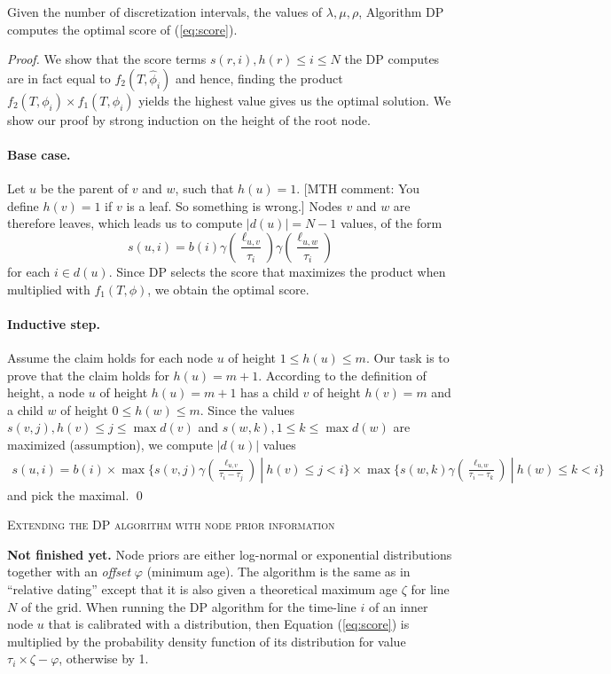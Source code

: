 \documentclass{llncs}
\newcommand{\mthcomment}[1]{{[\color{red}MTH comment: #1]}}
\renewcommand{\section}[1]{%
\bigskip
\begin{center}
\begin{Large}
\normalfont\scshape #1
\medskip
\end{Large}
\end{center}}
\begin{document}
\begin{theorem}[Optimality of DP]
Given the number of discretization intervals, the values of $\lambda,\mu,\rho$,
Algorithm DP computes the optimal score of (\ref{eq:score}).
\end{theorem}
\begin{proof}
We show that the score terms $s(r,i), h(r) \leq i \leq N$ the DP computes are
in fact equal to $f_2(T,\hat\phi_i)$ and hence, finding the product
$f_2(T,\phi_i)\times f_1(T,\phi_i)$ yields the highest value gives us the
optimal solution. We show our proof by strong induction on the height of the
root node.
\paragraph{Base case.} Let $u$ be the parent of $v$ and $w$, such that $h(u) =
1$. \mthcomment{You define $h(v) = 1$ if $v$ is a leaf. So something is wrong.}
 Nodes $v$ and $w$ are therefore leaves, which leads us to compute
$|d(u)|=N-1$ values, of the form
%
%
$$
s(u,i) = b(i)
         \gamma(\frac{\ell_{u,v}}{\tau_i})
         \gamma(\frac{\ell_{u,w}}{\tau_i})
$$
%
%
for each $i \in d(u)$. Since DP selects the score that maximizes the product
when multiplied with $f_1(T,\phi)$, we obtain the optimal score.
\paragraph{Inductive step.} Assume the claim holds for each node $u$ of height
$1 \leq h(u) \leq m$. Our task is to prove that the claim holds for $h(u) =
m+1$.  According to the definition of height, a node $u$ of height $h(u)=m+1$
has a child $v$ of height $h(v)=m$ and a child $w$ of height $0 \leq h(w) \leq
m$.  Since the values $s(v,j), h(v) \leq j \leq \max d(v)$ and $s(w,k), 1 \leq
k \leq \max d(w)$ are maximized (assumption), we compute $|d(u)|$ values
%
%
\begin{equation*}
\begin{split}
s(u,i) =  b(i)\times 
          \max\{ s(v,j)\gamma(\frac{\ell_{u,v}}{\tau_i-\tau_j})\ |\
              h(v) \leq j < i\} \times 
          \max\{ s(w,k)\gamma(\frac{\ell_{u,w}}{\tau_i-\tau_k})\ |\ 
               h(w) \leq k < i\}
\end{split}
\end{equation*}
%
%
and pick the maximal.
\qed\end{proof}

\section{Extending the DP algorithm with node prior information}
\textbf{Not finished yet.} Node priors are either log-normal or exponential
distributions together with an {\em offset} $\varphi$ (minimum age).  The
algorithm is the same as in ``relative dating'' except that it is also given a
theoretical maximum age $\zeta$ for line $N$ of the grid.  When running the DP
algorithm for the time-line $i$ of an inner node $u$ that is calibrated with a
distribution, then Equation (\ref{eq:score}) is multiplied by the probability
density function of its distribution for value $\tau_i \times \zeta - \varphi$,
otherwise by 1.
\end{document}
